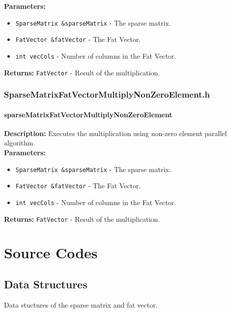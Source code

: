 \documentclass[12pt,oneside]{book} %
\begin{document}
\begin{subappendices}
    \textbf{Parameters:}
    \begin{itemize}
        \item \texttt{SparseMatrix \&sparseMatrix} - The sparse matrix.
        \item \texttt{FatVector \&fatVector} - The Fat Vector.
        \item \texttt{int vecCols} - Number of columns in the Fat Vector.
    \end{itemize}

    \textbf{Returns:} \texttt{FatVector} - Result of the multiplication.

    \subsection{SparseMatrixFatVectorMultiplyNonZeroElement.h}
    \subsubsection{sparseMatrixFatVectorMultiplyNonZeroElement}
    \textbf{Description:} Executes the multiplication using non-zero element parallel algorithm.\\

    \textbf{Parameters:}
    \begin{itemize}
        \item \texttt{SparseMatrix \&sparseMatrix} - The sparse matrix.
        \item \texttt{FatVector \&fatVector} - The Fat Vector.
        \item \texttt{int vecCols} - Number of columns in the Fat Vector.
    \end{itemize}

    \textbf{Returns:} \texttt{FatVector} - Result of the multiplication.

\end{subappendices}

\chapter{Source Codes}
\begin{subappendices}
    \section{Data Structures}\label{appendix:data-structures}
    Data stuctures of the sparse matrix and fat vector.

\end{subappendices}
\end{document}
